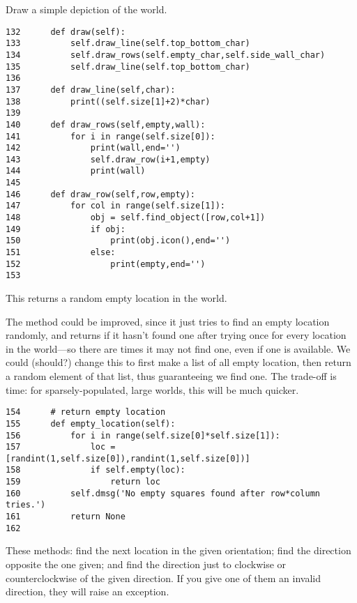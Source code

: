 \documentclass[11pt]{tufte-handout}
\begin{document}
Draw a simple depiction of the world.

\begin{verbatim}
132      def draw(self):
133          self.draw_line(self.top_bottom_char)
134          self.draw_rows(self.empty_char,self.side_wall_char)
135          self.draw_line(self.top_bottom_char)
136          
137      def draw_line(self,char):
138          print((self.size[1]+2)*char)
139  
140      def draw_rows(self,empty,wall):
141          for i in range(self.size[0]):
142              print(wall,end='')
143              self.draw_row(i+1,empty)
144              print(wall)
145  
146      def draw_row(self,row,empty):
147          for col in range(self.size[1]):
148              obj = self.find_object([row,col+1])
149              if obj:
150                  print(obj.icon(),end='')
151              else:
152                  print(empty,end='')
153  
\end{verbatim}

This returns a random empty location in the world. 

The method could be improved, since it just tries to find an empty location randomly, and returns if it hasn't found one after trying once for every location in the world---so there are times it may not find one, even if one is available.  We could (should?) change this to first make a list of all empty location, then return a random element of that list, thus guaranteeing we find one.  The trade-off is time:  for sparsely-populated, large worlds, this will be much quicker.

\begin{verbatim}
154      # return empty location
155      def empty_location(self):
156          for i in range(self.size[0]*self.size[1]):
157              loc = [randint(1,self.size[0]),randint(1,self.size[0])]
158              if self.empty(loc):
159                  return loc
160          self.dmsg('No empty squares found after row*column tries.')
161          return None
162  
\end{verbatim}

These methods: find the next location in the given orientation; find the direction opposite the one given; and find the direction just to clockwise or counterclockwise of the given direction.  If you give one of them an invalid direction, they will raise an exception.
\end{document}
